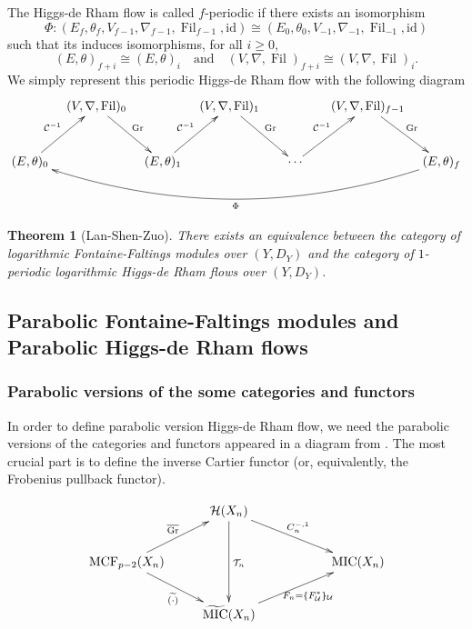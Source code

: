 \documentclass[12pt,twoside]{book}
\theoremstyle{plain}
\newtheorem{theorem}{Theorem}[section]
\theoremstyle{definition}
\theoremstyle{remark}
\newcommand{\mC}{{\mathcal C}}
\newcommand{\mH}{{\mathcal H}}
\newcommand{\mT}{{\mathcal T}}
\newcommand{\mU}{{\mathcal U}}
\DeclareMathOperator\Fil{Fil}
\DeclareMathOperator\Gr{Gr}
\newcommand{\MCF}{\mathrm{MCF}}
\newcommand{\MIC}{\mathrm{MIC}}
\numberwithin{equation}{section}
\begin{document}
The Higgs-de Rham flow is called $f$-periodic if there exists an isomorphism
\[\Phi\colon (E_{f},\theta_{f},V_{f-1},\nabla_{f-1},\Fil_{f-1},\mathrm{id}) \cong (E_0,\theta_0,V_{-1},\nabla_{-1},\Fil_{-1},\mathrm{id})\]
such that its induces isomorphisms, for all $i\geq0$,
\[(E,\theta)_{f+i}\cong (E,\theta)_{i} \quad\text{and}\quad (V,\nabla,\Fil)_{f+i}\cong (V,\nabla,\Fil)_{i}.\]
We simply represent this periodic Higgs-de Rham flow with the following diagram
\begin{equation} \label{diag:HDF}
\xymatrix@W=10mm@C=3mm@R=10mm{
& (V,\nabla,\Fil)_{0} \ar[dr]^{\Gr}
&& (V,\nabla,\Fil)_{1} \ar[dr]^{\Gr}
&& (V,\nabla,\Fil)_{f-1} \ar[dr]^{\Gr}
&\\
(E,\theta)_{0} \ar[ur]^{\mC^{-1}}
&& (E,\theta)_{1} \ar[ur]^{\mC^{-1}}
&& \cdots \ar[ur]^{\mC^{-1}}
&& (E,\theta)_{f} \ar@/^30pt/[llllll]^{\Phi}\\}
\end{equation}
\begin{theorem}[Lan-Shen-Zuo\cite{LSZ19}]\label{equiv:FF&HDF}
There exists an equivalence between the category of logarithmic Fontaine-Faltings modules over $(Y,D_Y)$ and the category of $1$-periodic logarithmic Higgs-de Rham flows over $(Y,D_Y)$.
\end{theorem}

\newpage

\subsection{Parabolic Fontaine-Faltings modules and Parabolic Higgs-de Rham flows}

\subsubsection{Parabolic versions of the some categories and functors}

In order to define parabolic version Higgs-de Rham flow, we need the parabolic versions of the categories and functors appeared in a diagram from \cite[Section 1.2.1]{SYZ22}. The most crucial part is to define the inverse Cartier functor (or, equivalently, the Frobenius pullback functor).

\begin{equation}\label{diag:C^{-1}}
\xymatrix{
& \mH(X_n)\ar[drr]^-{C_n^{- ,1}} \ar[dd]^{\mT_n}
&&\\
\MCF_{p-2}(X_n)\ar[dr]_{\widetilde{(\cdot)}}\ar[ur]^{\overline{\Gr}}
&&& \MIC(X_n)\\
&\widetilde{\MIC}(X_n) \ar[urr]_-{F_n=\{F_\mU^*\}_\mU}&&\\
}
\end{equation}
\end{document}
